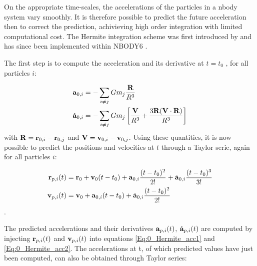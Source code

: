 On the appropriate time-scales, the accelerations of the particles in a nbody system vary smoothly. It is therefore possible to predict the future acceleration then to correct the prediction, achivieving high order integration with limited computational cost. The Hermite integration scheme was first  introduced by \cite{Makino1991} and has since been implemented within NBODY6 \citep{Aarseth2003}.


The first step is to compute the acceleration and its derivative at $t=t_0$ , for all particles $i$:

\begin{align}
\label{Eq:0_Hermite_acc1}
\bold{a}_{0,i} &= - \sum\limits_{i\neq j} G m_j \frac{\bold{R}}{R^3}\\
\label{Eq:0_Hermite_acc2}
\dot{\bold{a}}_{0,i} &=  - \sum\limits_{i\neq j} G m_j \left[ \frac{\bold{V}}{R^3}  + 
	\frac{ 3 \bold{R} ( \bold{V} \cdot \bold{R} )  }{R^3}\right]
\end{align}
with $\bold{R} = \bold{r}_{0,i} - \bold{r}_{0,j} $ and $\bold{V} = \bold{v}_{0,i} - \bold{v}_{0,j} $. Using these quantities, it is now possible to predict the positions and velocities at $t$ through a Taylor serie, again for all particles $i$:

\begin{align}
\bold{r}_{p,i}(t) &= \bold{r}_0 + \bold{v}_0 (t-t_0) + \bold{a}_{0,i}\frac{(t-t_0)^2}{2!} 	
		 +\dot{\bold{a}}_{0,i}\frac{(t-t_0)^3}{3!}\\
\bold{v}_{p,i}(t) &= \bold{v}_0 + \bold{a}_{0,i}(t-t_0) + \dot{\bold{a}}_{0,i}\frac{(t-t_0)^2}{2!}
\end{align}.

The predicted accelerations and their derivatives $\bold{a}_{p,i}(t)$,  $\dot{\bold{a}}_{p,i}(t)$ are computed by injecting $\bold{r}_{p,i}(t)$ and $\bold{v}_{p,i}(t)$ into equations \ref{Eq:0_Hermite_acc1} and \ref{Eq:0_Hermite_acc2}. The accelerations at t, of which predicted values have just been computed, can also be obtained through Taylor series:

